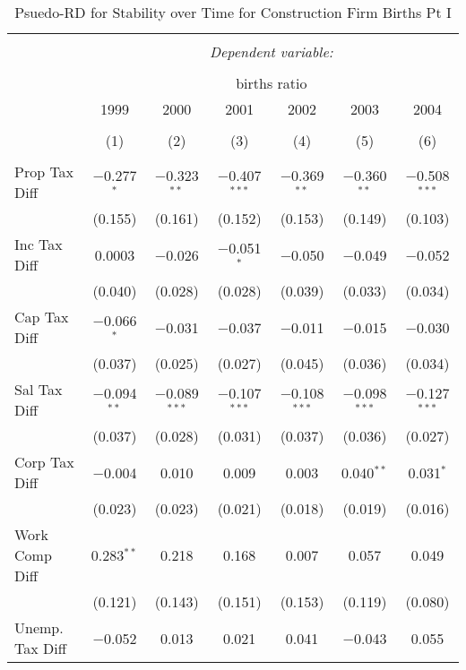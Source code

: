 
\begin{table}[!htbp] \centering 
  \caption{Psuedo-RD for Stability over Time for  Construction Firm Births Pt I} 
  \label{23year} 
\small 
\begin{tabular}{@{\extracolsep{5pt}}lcccccc} 
\\[-1.8ex]\hline 
\hline \\[-1.8ex] 
 & \multicolumn{6}{c}{\textit{Dependent variable:}} \\ 
\cline{2-7} 
\\[-1.8ex] & \multicolumn{6}{c}{births ratio} \\ 
 & 1999 & 2000 & 2001 & 2002 & 2003 & 2004 \\ 
\\[-1.8ex] & (1) & (2) & (3) & (4) & (5) & (6)\\ 
\hline \\[-1.8ex] 
 Prop Tax Diff & $-$0.277$^{*}$ & $-$0.323$^{**}$ & $-$0.407$^{***}$ & $-$0.369$^{**}$ & $-$0.360$^{**}$ & $-$0.508$^{***}$ \\ 
  & (0.155) & (0.161) & (0.152) & (0.153) & (0.149) & (0.103) \\ 
  Inc Tax Diff & 0.0003 & $-$0.026 & $-$0.051$^{*}$ & $-$0.050 & $-$0.049 & $-$0.052 \\ 
  & (0.040) & (0.028) & (0.028) & (0.039) & (0.033) & (0.034) \\ 
  Cap Tax Diff & $-$0.066$^{*}$ & $-$0.031 & $-$0.037 & $-$0.011 & $-$0.015 & $-$0.030 \\ 
  & (0.037) & (0.025) & (0.027) & (0.045) & (0.036) & (0.034) \\ 
  Sal Tax Diff & $-$0.094$^{**}$ & $-$0.089$^{***}$ & $-$0.107$^{***}$ & $-$0.108$^{***}$ & $-$0.098$^{***}$ & $-$0.127$^{***}$ \\ 
  & (0.037) & (0.028) & (0.031) & (0.037) & (0.036) & (0.027) \\ 
  Corp Tax Diff & $-$0.004 & 0.010 & 0.009 & 0.003 & 0.040$^{**}$ & 0.031$^{*}$ \\ 
  & (0.023) & (0.023) & (0.021) & (0.018) & (0.019) & (0.016) \\ 
  Work Comp Diff & 0.283$^{**}$ & 0.218 & 0.168 & 0.007 & 0.057 & 0.049 \\ 
  & (0.121) & (0.143) & (0.151) & (0.153) & (0.119) & (0.080) \\ 
  Unemp. Tax Diff & $-$0.052 & 0.013 & 0.021 & 0.041 & $-$0.043 & 0.055 \\ 

\end{tabular}
\end{table}
